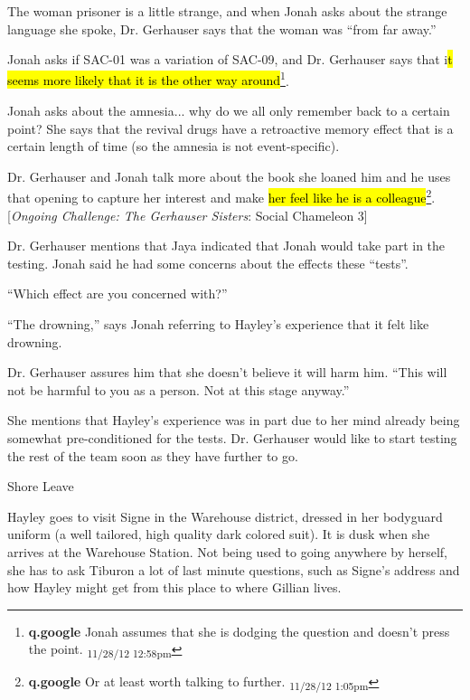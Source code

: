 The woman prisoner is a little strange, and when Jonah asks about the strange language she spoke, Dr. Gerhauser says that the woman was ``from far away.''



Jonah asks if SAC-01 was a variation of SAC-09, and Dr. Gerhauser says that i\hl{t seems more likely that it is the other way around}\footnote{\textbf{q.google }Jonah assumes that she is dodging the question and doesn't press the point. \textsubscript{11/28/12 12:58pm}}.



Jonah asks about the amnesia... why do we all only remember back to a certain point?  She says that the revival drugs have a retroactive memory effect that is a certain length of time (so the amnesia is not event-specific).



Dr. Gerhauser and Jonah talk more about the book she loaned him and he uses that opening to capture her interest and make \hl{her feel like he is a colleague}\footnote{\textbf{q.google }Or at least worth talking to further. \textsubscript{11/28/12 1:05pm}}. {[}\textit{Ongoing Challenge: The Gerhauser Sisters}: Social Chameleon 3{]} 



Dr. Gerhauser mentions that Jaya indicated that Jonah would take part in the testing.  Jonah said he had some concerns about the effects these ``tests''.

``Which effect are you concerned with?''

``The drowning,'' says Jonah referring to Hayley's experience that it felt like drowning.

Dr. Gerhauser assures him that she doesn't believe it will harm him.  ``This will not be harmful to you as a person.  Not at this stage anyway.''

She mentions that Hayley's experience was in part due to her mind already being somewhat pre-conditioned for the tests.  Dr. Gerhauser would like to start testing the rest of the team soon as they have further to go.



 {\LARGE Shore Leave } 



Hayley goes to visit Signe in the Warehouse district, dressed in her bodyguard uniform (a well tailored, high quality dark colored suit).  It is dusk when she arrives at the Warehouse Station.  Not being used to going anywhere by herself, she has to ask Tiburon a lot of last minute questions, such as Signe's address and how Hayley might get from this place to where Gillian lives. 



